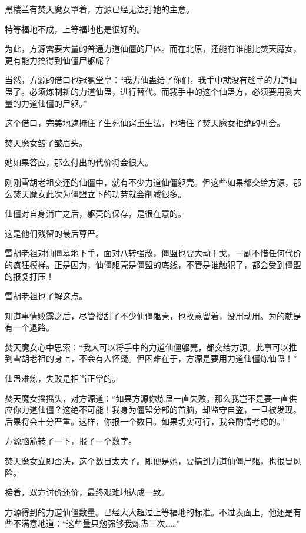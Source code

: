 
\begin{this_body}

黑楼兰有焚天魔女罩着，方源已经无法打她的主意。

特等福地不成，上等福地也是很好的。

为此，方源需要大量的普通力道仙僵的尸体。而在北原，还能有谁能比焚天魔女，更有能力搞得到仙僵尸躯呢？

当然，方源的借口也冠冕堂皇：“我力仙蛊给了你们，我手中就没有趁手的力道仙蛊了。必须炼制新的力道仙蛊，进行替代。而我手中的这个仙蛊方，必须要用到大量的力道仙僵的尸躯。”

这个借口，完美地遮掩住了生死仙窍重生法，也堵住了焚天魔女拒绝的机会。

焚天魔女皱了皱眉头。

她如果答应，那么付出的代价将会很大。

刚刚雪胡老祖交还的仙僵中，就有不少力道仙僵躯壳。但这些如果都交给方源，那么焚天魔女此次为僵盟立下的功劳就会削减很多。

仙僵对自身消亡之后，躯壳的保存，是很在意的。

这是他们残留的最后尊严。

雪胡老祖对仙僵墓地下手，面对八转强敌，僵盟也要大动干戈，一副不惜任何代价的疯狂模样。正是因为，仙僵躯壳是僵盟的底线，不管是谁触犯了，都会受到僵盟的报复打压！

雪胡老祖也了解这点。

知道事情败露之后，尽管搜刮了不少仙僵躯壳，也故意留着，没用动用。为的就是有一个退路。

焚天魔女心中思索：“我大可以将手中的力道仙僵躯壳，都交给方源。此事可以推到雪胡老祖的身上，不会有人怀疑。但困难在于，方源是要用力道仙僵炼仙蛊！”

仙蛊难炼，失败是相当正常的。

焚天魔女摇摇头，对方源道：“如果方源你炼蛊一直失败。那么我岂不是要一直供应你力道仙僵？这绝不可能！我身为僵盟分部的首脑，却监守自盗，一旦被发现。后果将会十分严重。这样，你报一个数目。如果切实可行，我会酌情考虑的。”

方源脑筋转了一下，报了一个数字。

焚天魔女立即否决，这个数目太大了。即便是她，要搞到力道仙僵尸躯，也很冒风险。

接着，双方讨价还价，最终艰难地达成一致。

方源得到的力道仙僵数量。已经大大超过上等福地的标准。不过表面上，他还是有些不满意地道：“这些量只勉强够我炼蛊三次……”


\end{this_body}
